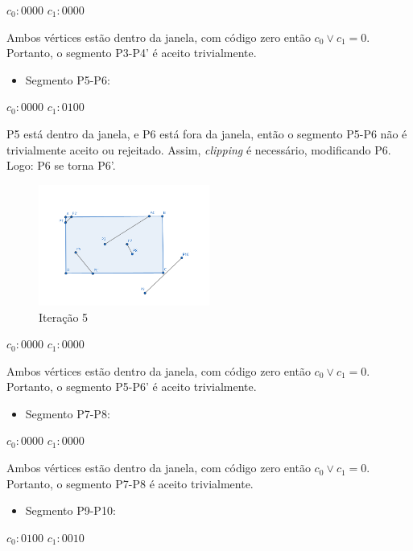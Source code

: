\documentclass[12pt]{article}
\begin{document}
$c_0: 0000$ \hspace{1cm} $c_1: 0000$

Ambos vértices estão dentro da janela, com código zero então $c_0 \lor c_1 = 0$. Portanto, o segmento P3-P4' é aceito trivialmente.

\begin{itemize}
    \item Segmento P5-P6:
\end{itemize}
$c_0: 0000$ \hspace{1cm} $c_1: 0100$

P5 está dentro da janela, e P6 está fora da janela, então o segmento P5-P6 não é trivialmente aceito ou rejeitado. Assim, \textit{clipping} é necessário, modificando P6. Logo: P6 se torna P6'.

\begin{figure}[H]
    \centering
    \includegraphics[width=0.5\textwidth]{images/4/4it5.png}
    \caption*{Iteração 5}
\end{figure}

$c_0: 0000$ \hspace{1cm} $c_1: 0000$

Ambos vértices estão dentro da janela, com código zero então $c_0 \lor c_1 = 0$. Portanto, o segmento P5-P6' é aceito trivialmente.

\begin{itemize}
    \item Segmento P7-P8:
\end{itemize}
$c_0: 0000$ \hspace{1cm} $c_1: 0000$

Ambos vértices estão dentro da janela, com código zero então $c_0 \lor c_1 = 0$. Portanto, o segmento P7-P8 é aceito trivialmente.

\begin{itemize}
    \item Segmento P9-P10:
\end{itemize}
$c_0: 0100$ \hspace{1cm} $c_1: 0010$
\end{document}
